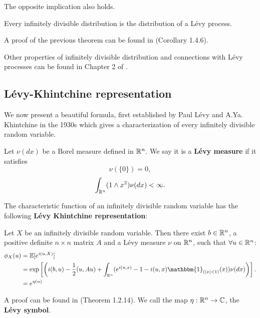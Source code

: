 The opposite implication also holds. 
\begin{Theorem}
Every infinitely divisible distribution is the distribution of a Lévy process. 
\end{Theorem}
A proof of the previous theorem can be found in \cite{Applebaum} (Corollary 1.4.6).

Other properties of infinitely divisible distribution and connections with Lévy processes can be found in Chapter 2 of \cite{Sato}.\\

\subsection{Lévy-Khintchine representation}

We now present a beautiful formula, first established by Paul Lévy and A.Ya. Khintchine in the 1930s
which gives a characterization of every infinitely divisible random variable.\\

\begin{Definition} \label{Levy_measure}
Let $\nu(dx)$ be a Borel measure defined in $\mathbb{R}^n$. We say it is a \textbf{Lévy measure} if it satisfies
\begin{equation}
 \nu (\{ 0 \} ) = 0,
\end{equation}
\begin{equation} \label{Levy_m}
 \int_{\mathbb{R}^n} (1\wedge x^2) \nu(dx) < \infty.
\end{equation}
\end{Definition}
The characteristic function of an infinitely divisible random variable has the following \textbf{Lévy Khintchine representation}:
\begin{Theorem}
 Let $X$ be an infinitely divisible random variable. Then there exist $b\in \mathbb{R}^n$, a positive definite $n\times n$ matrix $A$
 and a Lévy measure $\nu$ on $\mathbb{R}^n$, such that $\forall u \in \mathbb{R}^n$:
\begin{align}
\phi_X(u)  &= \mathbb{E} [e^{i(u,X)}]  \\ 
	   &= \exp \left[ \left( i(b,u) - \frac{1}{2}(u,Au) + \int_{\R^n} 
	   ( e^{i(u,x)} -1 -i(u,x) \mathbbm{1}_{(|x|<1)}(x) ) \nu(dx) \right) \right]. \nonumber \\		      
	   &= e^{\eta(u)} \nonumber
\end{align}
\end{Theorem}
A proof can be found in \cite{Applebaum} (Theorem 1.2.14).
We call the map $\eta : \mathbb{R}^n \to \mathbb{C}$, the \textbf{Lévy symbol}.

